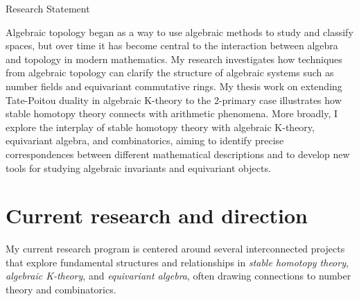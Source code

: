 \documentclass[11pt]{article}
\begin{document}
\begin{center}\LARGE{Research Statement}
\end{center}
Algebraic topology began as a way to use algebraic methods to study and classify spaces, but over time it has become central to the interaction between algebra and topology in modern mathematics.
My research investigates how techniques from algebraic topology can clarify the structure of algebraic systems such as number fields and equivariant commutative rings.
My thesis work on extending Tate-Poitou duality in algebraic K-theory to the 2-primary case illustrates how stable homotopy theory connects with arithmetic phenomena.
More broadly, I explore the interplay of stable homotopy theory with algebraic K-theory, equivariant algebra, and combinatorics, aiming to identify precise correspondences between different mathematical descriptions and to develop new tools for studying algebraic invariants and equivariant objects.

\section{Current research and direction}

My current research program is centered around several interconnected projects that explore fundamental structures and relationships in {\it stable homotopy theory}, {\it algebraic K-theory}, and {\it equivariant algebra}, often drawing connections to number theory and combinatorics.
\end{document}
